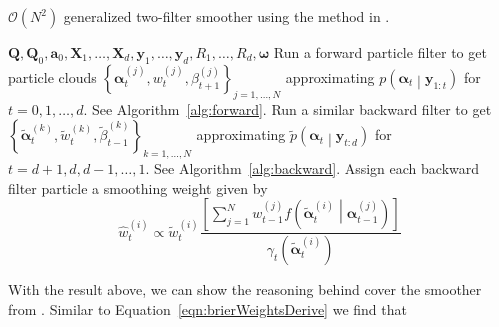 \documentclass[notitlepage]{article}
\newcommand\StateXX{\Statex\hspace{\algorithmicindent}\hspace{\algorithmicindent}}
\renewcommand{\vec}[1]{\bm{#1}}
\newcommand{\mat}[1]{\mathbf{#1}}
\newcommand{\Lbrac}[1]{\left[ #1\right]}
\newcommand{\Lbrace}[1]{\left\{ #1\right\}}
\newcommand{\Lparen}[1]{\left( #1\right)}
\newcommand{\Cond}[2]{ #1 \middle\vert  #2}
\newcommand{\optor}[2]{#1\Lparen{#2}}
\newcommand{\optorC}[3]{\optor{#1}{\Cond{#2}{#3}}}
\newcommand{\pdensC}[2]{\optorC{p}{#1}{#2}}
\newcommand{\pdenstC}[2]{\optorC{\widetilde p}{#1}{#2}}
\newcommand{\partic}[3]{#1_{#2}^{\Lparen{#3}}}
\newcommand{\particB}[3]{\widetilde{#1}_{#2}^{\Lparen{#3}}}
\newcommand{\particS}[3]{\widehat{#1}_{#2}^{\Lparen{#3}}}
\newcommand{\bigO}[1]{\mathcal{O}\Lparen{#1}}
\newcommand{\nPart}{N}
\newcommand{\nPeriods}{d}
\begin{document}
\begin{algorithm}[H]
\caption{$\bigO{\nPart^2}$ generalized two-filter smoother using the method in \citet{briers09}.}\label{alg:ON2smoother}
\begin{algorithmic}[1]\raggedright
\INPUT
\Statex $\mat{Q},\mat{Q}_0,\vec{a}_0,\mat{X}_1,\dots,\mat{X}_d,\vec{y}_1,\dots,\vec{y}_d,R_1,\dots,R_d,\vec{\omega}$
%
\State Run a forward particle filter to get particle clouds %
	$\Lbrace{\partic{\vec{\alpha}}{t}{j}, \partic{w}{t}{j}, \partic{\beta}{t + 1}{j}}_{j=1,\dots,N}$ %
	approximating $\pdensC{\vec{\alpha}_t}{\vec{y}_{1:t}}$ for $t = 0, 1, \dots, \nPeriods$. See Algorithm~\ref{alg:forward}.
\EndProcedure
%
\State Run a similar backward filter to get %
	$\Lbrace{\particB{\vec{\alpha}}{t}{k}, \particB{w}{t}{k}, \particB{\beta}{t - 1}{k}}_{k=1,\dots,N}$  %
	approximating $\pdenstC{\vec{\alpha}_t}{\vec{y}_{t:\nPeriods}}$ for $t = \nPeriods + 1, \nPeriods, \nPeriods-1, \dots, 1$. See Algorithm~\ref{alg:backward}.
\EndProcedure
%
\For{$t=1,\dots, \nPeriods$}
\State Assign each backward filter particle a smoothing weight given by
\StateXX \begin{equation}\label{eqn:combineWeightO2}
\particS{w}{t}{i} \propto
	\particB{w}{t}{i} \frac{\Lbrac{
		\sum_{j = 1}^\nPart \partic{w}{t - 1}{j}
		\optorC{f}{\particB{\vec{\alpha}}{t}{i}}{\partic{\vec{\alpha}}{t - 1}{j}}
	}}{ \optor{\gamma_t}{\particB{\vec{\alpha}}{t}{i}}}
\end{equation}
\EndFor
\EndProcedure
\end{algorithmic}
\end{algorithm}

With the result above, we can show the reasoning behind cover the 
smoother from \cite{fearnhead10}. Similar to Equation~\eqref{eqn:brierWeightsDerive} we find that 
\end{document}

